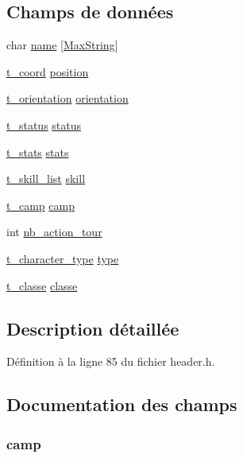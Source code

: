 \subsection*{Champs de données}
\begin{DoxyCompactItemize}
\item 
char \hyperlink{structt__character_ab27f28c5ead39031421706ddbbd1edea}{name} \mbox{[}\hyperlink{header_8h_ab154998a3a376095f3601bc35c5cf523}{Max\+String}\mbox{]}
\item 
\hyperlink{structt__coord}{t\+\_\+coord} \hyperlink{structt__character_a27c93348dcaa3ea78282fb5ef6ce371b}{position}
\item 
\hyperlink{header_8h_a6dc6eccccaf78ef029cff998c0e654f4}{t\+\_\+orientation} \hyperlink{structt__character_af778044107ad1a59b9725fa3962560ad}{orientation}
\item 
\hyperlink{structt__status}{t\+\_\+status} \hyperlink{structt__character_a3ade6b90793e915ca28b52fb70e58e3f}{status}
\item 
\hyperlink{structt__stats}{t\+\_\+stats} \hyperlink{structt__character_a29711825af64d428d19df366a5056670}{stats}
\item 
\hyperlink{structt__skill__list}{t\+\_\+skill\+\_\+list} \hyperlink{structt__character_ae7aa14804e69b1bc9652c16261da0c9f}{skill}
\item 
\hyperlink{header_8h_a4bb25c9352f7bb2ea2eb663ccf579528}{t\+\_\+camp} \hyperlink{structt__character_a48707185be865bad67e5c61e5903ae5a}{camp}
\item 
int \hyperlink{structt__character_aaff424b51f4bd3db2c199cc08f21f86d}{nb\+\_\+action\+\_\+tour}
\item 
\hyperlink{header_8h_ac8020d257c824e4b188c04ee386ebfda}{t\+\_\+character\+\_\+type} \hyperlink{structt__character_a3b5fecb9824668aab778f82005089942}{type}
\item 
\hyperlink{header_8h_a853cf4e56ef5ad960bf764a4fafe7e77}{t\+\_\+classe} \hyperlink{structt__character_a6d86411cdb6af508aed7d5904887ac6e}{classe}
\end{DoxyCompactItemize}


\subsection{Description détaillée}


Définition à la ligne 85 du fichier header.\+h.



\subsection{Documentation des champs}
\hypertarget{structt__character_a48707185be865bad67e5c61e5903ae5a}{
\subsubsection[{camp}]{ camp}}\label{structt__character_a48707185be865bad67e5c61e5903ae5a}


